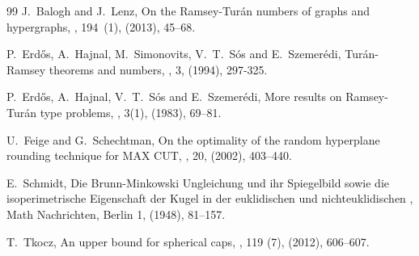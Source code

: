 \documentclass[10pt,a4paper]{article}
\theoremstyle{definition}
\begin{document}
\begin{thebibliography}{99}
J.~Balogh and J.~Lenz,
\newblock On the {R}amsey-{T}ur\'an numbers of graphs and hypergraphs,
, 194~(1), (2013), 45--68.

P.~Erd\H os, A.~Hajnal, M.~Simonovits, V.~T.~S\'os and E.~Szemer\'edi,
\newblock Tur\'an-Ramsey theorems and  numbers,
, 3, (1994), 297-325.

P.~Erd\H os, A.~Hajnal, V.~T.~S\'os and E.~Szemer\'edi,
\newblock More results on Ramsey-Tur\'an type problems,
, 3(1), (1983), 69--81.

U.~Feige and G.~Schechtman,
\newblock On the optimality of the random hyperplane rounding technique for MAX CUT,
, 20, (2002), 403--440.

E.~Schmidt, 
\newblock Die Brunn-Minkowski Ungleichung und ihr Spiegelbild sowie die isoperimetrische Eigenschaft der Kugel in der euklidischen und nichteuklidischen
, Math Nachrichten, Berlin 1, (1948), 81--157.

T.~Tkocz,
\newblock An upper bound for spherical caps,
, 119 (7), (2012), 606--607.

\end{thebibliography}
\end{document}
